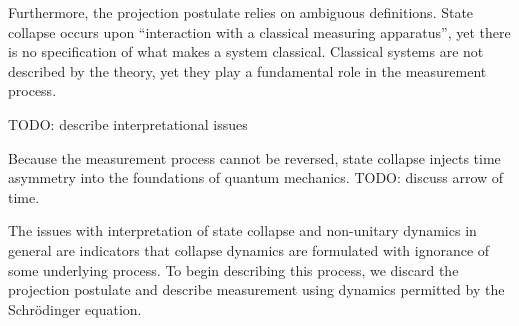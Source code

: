 Furthermore, the projection postulate relies on ambiguous definitions. State collapse occurs upon ``interaction with a classical measuring apparatus'', yet there is no specification of what makes a system classical. Classical systems are not described by the theory, yet they play a fundamental role in the measurement process.

TODO: describe interpretational issues

%

Because the measurement process cannot be reversed, state collapse injects time asymmetry into the foundations of quantum mechanics. TODO: discuss arrow of time.

The issues with interpretation of state collapse and non-unitary dynamics in general are indicators that collapse dynamics are formulated with ignorance of some underlying process. To begin describing this process, we discard the projection postulate and describe measurement using dynamics permitted by the Schrödinger equation.

